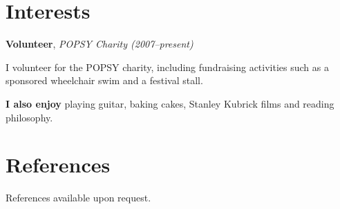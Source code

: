 \documentclass[11pt,a4paper,sans]{moderncv}
\begin{document}
\section{Interests}

{\large\textbf{Volunteer}, \textit{POPSY Charity (2007--present)}}

I volunteer for the POPSY charity, including fundraising activities such as a
sponsored wheelchair swim and a festival stall.
    
\vspace{0.75em}

{\large\textbf{I also enjoy}} playing guitar, baking cakes,
Stanley Kubrick films and reading philosophy.

\section{References}

References available upon request.
\end{document}
